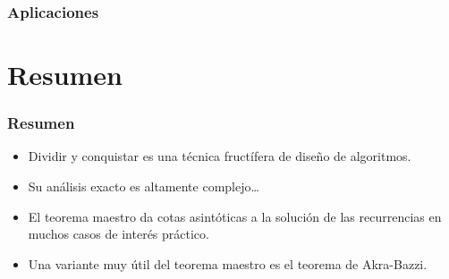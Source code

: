 \documentclass[english, spanish, fleqn,%
hyperref = {colorlinks, urlcolor = blue}%
]{beamer}
\begin{document}
\begin{frame}
  \setcounter{beamerpauses}{2}
  \frametitle{Aplicaciones}

\end{frame}

\section{Resumen}

\begin{frame}
  \setcounter{beamerpauses}{2}
  \frametitle{Resumen}

  \begin{itemize}
  \item
    Dividir y conquistar es una técnica fructífera de diseño de algoritmos.
  \item
    Su análisis exacto es altamente complejo\ldots
  \item
    El teorema maestro da cotas asintóticas a la solución de las recurrencias
    en muchos casos de interés práctico.
  \item
    Una variante muy útil del teorema maestro es el teorema de Akra-Bazzi.
  \end{itemize}
\end{frame}
\end{document}

